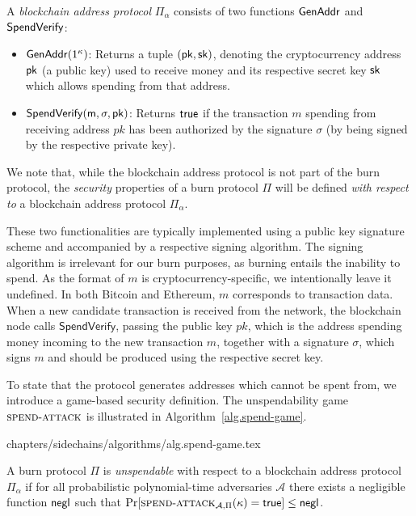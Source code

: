 \begin{definition}
  A \emph{blockchain address protocol} $\Pi_\alpha$ consists of two functions $\mathsf{Gen}\-\mathsf{Addr}$ and $\sf{SpendVerify}$:

  \begin{itemize}
    \item $\mathsf{Gen}\-\mathsf{Addr}(1^\kappa)$: Returns a tuple $(\sf{pk}, \sf{sk})$, denoting the cryptocurrency address $\sf{pk}$ (a public key) used to receive money and its respective secret key $\sf{sk}$ which allows spending from that address.

    \item $\sf{SpendVerify}(m, \sigma, pk)$: Returns $\sf{true}$ if the transaction $m$ spending from receiving address $pk$ has been authorized by the signature $\sigma$ (by being signed by the respective private key).
  \end{itemize}
\end{definition}

We note that, while the blockchain address protocol is not part of the burn protocol, the \emph{security} properties of a burn protocol $\Pi$ will be defined \emph{with respect to} a blockchain address protocol $\Pi_\alpha$.

These two functionalities are typically implemented using a public key signature scheme and accompanied by a respective signing algorithm. The signing algorithm is irrelevant for our burn purposes, as burning entails the inability to spend. As the format of $m$ is cryptocurrency-specific, we intentionally leave it undefined. In both Bitcoin and Ethereum, $m$ corresponds to transaction data. When a new candidate transaction is received from the network, the blockchain node calls $\textsf{SpendVerify}$, passing the public key $pk$, which is the address spending money incoming to the new transaction $m$, together with a signature $\sigma$, which signs $m$ and should be produced using the respective secret key.

To state that the protocol generates addresses which cannot be spent from, we introduce a game-based security definition. The unspendability game $\textsc{spend}\-\text{-}\-\textsc{attack}$ is illustrated in Algorithm~\ref{alg.spend-game}.

{chapters/sidechains/algorithms/alg.spend-game.tex}

\begin{definition}[Unspendability]
  A burn protocol $\Pi$ is \emph{unspendable} with respect to a blockchain address protocol $\Pi_\alpha$ if
  for all probabilistic polynomial-time adversaries $\mathcal{A}$ there exists a negligible function $\mathsf{negl}$ such that
  $
    \Pr[\textsc{spend}\-\text{-}\-\textsc{attack}_{\mathcal{A}, \Pi}(\kappa) = \textsf{true}] \leq \mathsf{negl}
  $.
\end{definition}

